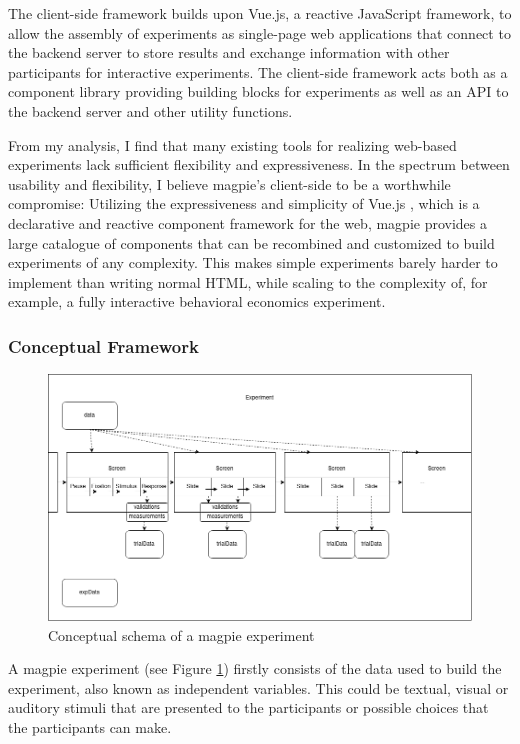 \documentclass[a4paper,10pt]{paper}
\begin{document}
The client-side framework builds upon Vue.js, a reactive JavaScript framework, to allow the assembly of experiments as single-page web applications that connect to the backend server to store results and exchange information with other participants for interactive experiments. The client-side framework acts both as a component library providing building blocks for experiments as well as an API to the backend server and other utility functions.

From my analysis, I find that many existing tools for realizing web-based experiments lack sufficient flexibility and expressiveness. In the spectrum between usability and flexibility, I believe magpie's client-side to be a worthwhile compromise: Utilizing the expressiveness and simplicity of Vue.js \citep{You2014}, which is a declarative and reactive component framework for the web, magpie provides a large catalogue of components that can be recombined and customized to build experiments of any complexity. This makes simple experiments barely harder to implement than writing normal HTML, while scaling to the complexity of, for example, a fully interactive behavioral economics experiment.

\subsubsection{Conceptual Framework}

\begin{figure}[h]
\includegraphics[width=\textwidth]{experiments_schema.png}
\caption{Conceptual schema of a magpie experiment}
\label{fig:concepts}
\end{figure}

A magpie experiment (see Figure \ref{fig:concepts}) firstly consists of the data used to build the experiment, also known as independent variables.
This could be textual, visual or auditory stimuli that are presented to the participants or possible choices that the participants can make.
\end{document}
